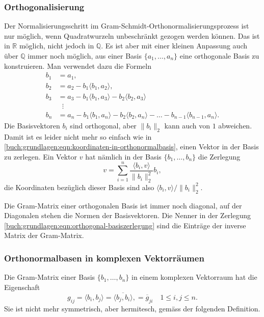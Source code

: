 \subsubsection{Orthogonalisierung}
Der Normalisierungsschritt im Gram-Schmidt-Orthonormalisierungsprozess
ist nur möglich, wenn Quadratwurzeln unbeschränkt gezogen werden können.
Das ist in $\mathbb{R}$ möglich, nicht jedoch in $\mathbb{Q}$.
Es ist aber mit einer kleinen Anpassung auch über $\mathbb{Q}$
immer noch möglich, aus einer Basis $\{a_1,\dots,a_n\}$ eine orthogonale
Basis zu konstruieren.
Man verwendet dazu die Formeln
\begin{align*}
b_1&=a_1,
\\
b_2&=a_2-b_1\langle b_1,a_2\rangle,
\\
b_3&=a_3-b_1\langle b_1,a_3\rangle-b_2\langle b_2,a_3\rangle
\\
&\phantom{n}\vdots\\
b_n
&=
a_n-b_1\langle b_1,a_n\rangle-b_2\langle b_2,a_n\rangle
-\dots-b_{n-1}\langle b_{n-1},a_n\rangle.
\end{align*}
Die Basisvektoren $b_i$ sind orthogonal, aber $\|b_i\|_2$ kann auch
von $1$ abweichen.
Damit ist es leider nicht mehr so einfach 
wie in \eqref{buch:grundlagen:eqn:koordinaten-in-orthonormalbasis},
einen Vektor in der Basis zu zerlegen.
Ein Vektor $v$ hat nämlich in der Basis $\{b_1,\dots,b_n\}$ die Zerlegung
\begin{equation}
v
=
\sum_{i=1}^n
\frac{\langle b_i,v\rangle}{\|b_i\|_2^2} b_i,
\label{buch:grundlagen:eqn:orthogonal-basiszerlegung}
\end{equation}
die Koordinaten bezüglich dieser Basis sind also
$\langle b_i,v\rangle/\|b_i\|_2^2$.

Die Gram-Matrix einer orthogonalen Basis ist immer noch diagonal,
auf der Diagonalen stehen die Normen der Basisvektoren.
Die Nenner in der Zerlegung
\eqref{buch:grundlagen:eqn:orthogonal-basiszerlegung}
sind die Einträge der inverse Matrix der Gram-Matrix.

\subsubsection{Orthonormalbasen in komplexen Vektorräumen}
Die Gram-Matrix einer Basis $\{b_1,\dots,b_n\}$ in einem komplexen
Vektorraum hat die Eigenschaft
\[
g_{i\!j}
=
\langle b_i,b_j\rangle
=
\overline{\langle b_j,b_i\rangle},
=
\overline{g}_{ji}
\quad 1\le i,j\le n.
\]
Sie ist nicht mehr symmetrisch, aber hermitesch, gemäss 
der folgenden Definition.


